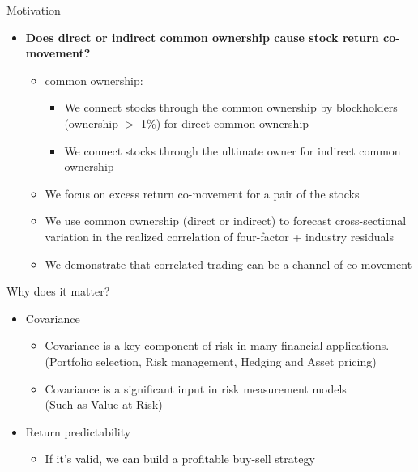 \documentclass[handout]{beamer}
\begin{document}
	\begin{frame}{Motivation}
		
		\begin{itemize}
			\item\textbf{Does direct or indirect common ownership cause stock return co-movement?}
			\begin{itemize}
				\item common ownership:
				\begin{itemize}
					\item We connect stocks through the common ownership by blockholders (ownership $ > $ 1\%) for direct common ownership
					\item We connect stocks through the ultimate owner for indirect common ownership
				\end{itemize}
				\item We focus on excess return co-movement for a pair of the stocks
				\item We use common ownership (direct or indirect) to forecast cross-sectional variation in the realized correlation of four-factor + industry residuals
				\item We demonstrate that correlated trading can be a channel of co-movement
			\end{itemize}
		\end{itemize}
		
	\end{frame}
	
	\begin{frame}{Why does it matter?}
		\begin{itemize}
			\item Covariance
			\begin{itemize}
				\item Covariance is a key component of risk in
				many financial applications.
				\scriptsize(Portfolio selection, Risk management, Hedging and Asset
				pricing)
				\small
				\item Covariance is a significant input in risk measurement models \\ \scriptsize(Such as Value-at-Risk)\small
				
			\end{itemize}
			\item Return predictability
			\begin{itemize}
				\item If it's valid, we can build a profitable buy-sell strategy
			\end{itemize}
		\end{itemize}
		
	\end{frame}
	
\end{document}
